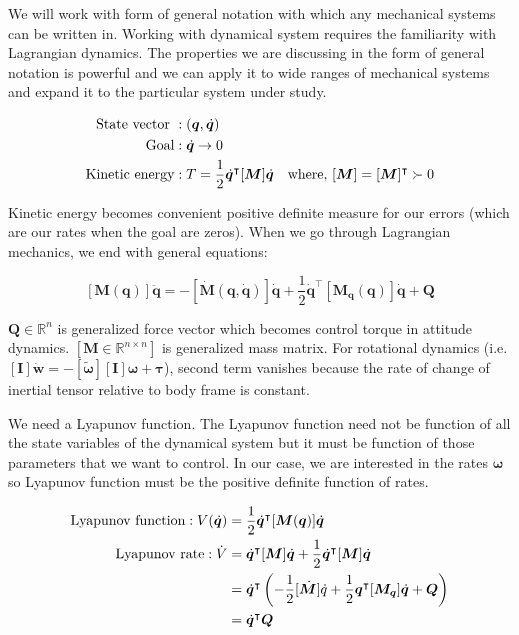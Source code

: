 \documentclass{article}
\begin{document}
We will work with form of general notation with which any mechanical systems can be written in. Working with dynamical system requires the familiarity with Lagrangian dynamics. The properties we are discussing in the form of general notation is powerful and we can apply it to wide ranges of mechanical systems and expand it to the particular system under study.

\begin{equation*}
  \begin{split}
  \textnormal{State vector }&:(\bm{q},\dot{\bm{q}})\\
  \textnormal{Goal}&:\dot{\bm{q}}\rightarrow0\\
  \textnormal{Kinetic energy}&:T=\frac{1}{2}\dot{\bm{q}}^{\intercal}[\bm{M}]\dot{\bm{q}}\quad\textnormal{where, }[\bm{M}]=[\bm{M}]^{\intercal}\succ0
  \end{split}
\end{equation*}

Kinetic energy becomes convenient positive definite measure for our errors (which are our rates when the goal are zeros). When we go through Lagrangian mechanics, we end with general equations:

$$
[\bm{M}(\bm{q})]\ddot{\bm{q}} = -[\dot{\bm{M}}(\bm{q},\dot{\bm{q}})]\dot{\bm{q}}+\frac{1}{2}\dot{\bm{q}}^{\intercal}[\bm{M}_{\bm{q}}(\bm{q})]\dot{\bm{q}}+\bm{Q}
$$

$\bm{Q}\in\mathbb{R}^{n}$ is generalized force vector which becomes control torque in attitude dynamics. $[\bm{M}\in\mathbb{R}^{n\times n}]$ is generalized mass matrix. For rotational dynamics (i.e. $[\bm{I}]\dot{\bm{w}}=-[\tilde{\bm{\omega}}][\bm{I}]\bm{\omega}+\bm{\tau}$), second term vanishes because the rate of change of inertial tensor relative to body frame is constant.

We need a Lyapunov function. The Lyapunov function need not be function of all the state variables of the dynamical system but it must be function of those parameters that we want to control. In our case, we are interested in the rates $\bm{\omega}$ so Lyapunov function must be the positive definite function of rates.

\begin{equation*}
  \begin{split}
    \textnormal{Lyapunov function}:V(\dot{\bm{q}})&=\frac{1}{2}\dot{\bm{q}}^{\intercal}[\bm{M}(\bm{q})]\dot{\bm{q}}\\
    \textnormal{Lyapunov rate}:\dot{V}&=\dot{\bm{q}}^{\intercal}[\bm{M}]\dot{\bm{q}}+\frac{1}{2}\dot{\bm{q}}^{\intercal}[\bm{M}]\dot{\bm{q}}\\
    &=\dot{\bm{q}}^{\intercal}\left(-\frac{1}{2}[\dot{\bm{M}}]\dot{q}+\frac{1}{2}\bm{q}^{\intercal}[\bm{M}_{\bm{q}}]\dot{\bm{q}}+\bm{Q}\right)\\
    &=\dot{\bm{q}}^{\intercal}\bm{Q}
  \end{split}
\end{equation*}
\end{document}
